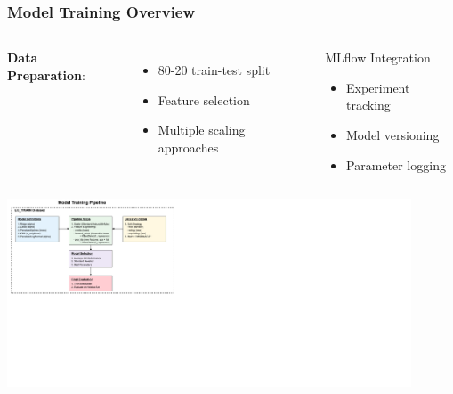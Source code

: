 \documentclass{beamer}
\begin{document}
\begin{frame}
\frametitle{Model Training Overview}
    \begin{columns}
        \textbf{Data Preparation}:
            \begin{itemize}
            \item 80-20 train-test split
            \item Feature selection
            \item Multiple scaling approaches
            \end{itemize}
            
        \begin{alertblock}{MLflow Integration}
            \begin{itemize}
            \item Experiment tracking
            \item Model versioning
            \item Parameter logging
            \end{itemize}
        \end{alertblock}
    \end{columns}

    \includegraphics[width=0.9\textwidth]{images/modeling/data_flow.pdf}
\end{frame}
\end{document}
